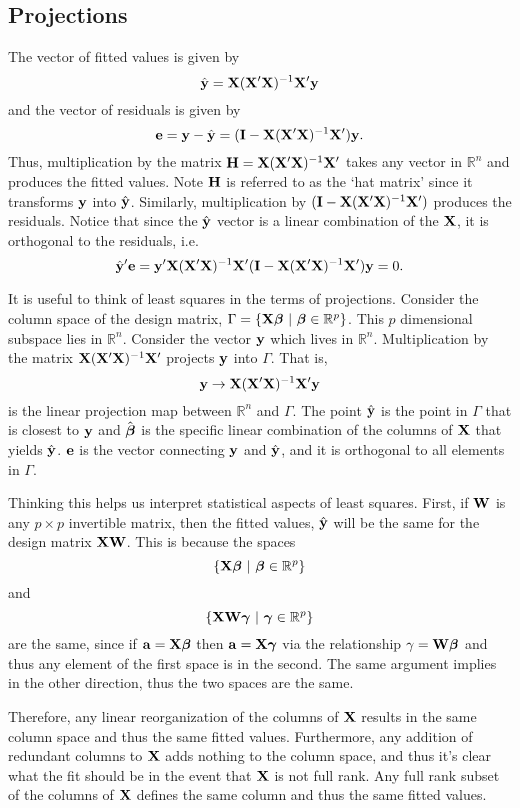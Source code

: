 \subsection{Projections}

The vector of fitted values is given by
$$
\hat {\mathbf{y}} = {\bf X} ({\bf X}'{\bf X})^{-1} {\bf X}' \mathbf{y}
$$
and the vector of residuals is given by
$$
\mathbf{e} = \mathbf{y} - \hat {\mathbf{y}} = (\mathbf{I} - {\bf X} ({\bf X}'{\bf X})^{-1} {\bf X}') \mathbf{y}.
$$
Thus, multiplication by the matrix $\mathbf{H}={\bf X} ({\bf X}'{\bf X})^{-1} {\bf X}'$ takes any vector in
$\mathbb{R}^n$ and produces the fitted values. Note $\mathbf{H}$ is referred to as the `hat matrix' since it transforms $\mathbf{y}$ into $\hat {\mathbf{y}}$.
Similarly, multiplication by $(\mathbf{I} - {\bf X} ({\bf X}'{\bf X})^{-1} {\bf X}')$ produces the residuals. 
Notice that since the $\hat {\mathbf{y}}$ vector is a linear combination of the $\mathbf{X}$,
it is orthogonal to the residuals, i.e.
$$
\hat {\mathbf{y}}' \mathbf{e} = \mathbf{y}' {\bf X} ({\bf X}'{\bf X})^{-1} {\bf X}' (\mathbf{I} - {\bf X} ({\bf X}'{\bf X})^{-1} {\bf X}')\mathbf{y} = 0.
$$

It is useful to think of least squares in the terms of projections.
Consider the column space of the design matrix, 
$\Gamma = \{ \mathbf{X} \boldsymbol{\beta} ~|~ \boldsymbol{\beta} \in \mathbb{R}^p\}$. This $p$ 
dimensional subspace lies in $\mathbb{R}^n$.
Consider the vector $\mathbf{y}$ which lives in $\mathbb{R}^n$. 
Multiplication by the matrix ${\bf X} ({\bf X}'{\bf X})^{-1} {\bf X}'$ projects $\mathbf{y}$ into $\Gamma$. That
is, 
$$
\mathbf{y} \rightarrow {\bf X} ({\bf X}'{\bf X})^{-1} {\bf X}' \mathbf{y}
$$
is the linear projection map between $\mathbb{R}^n$ and $\Gamma$.
The point $\hat {\mathbf{y}}$ is the point in $\Gamma$ that is closest to $\mathbf{y}$ and
$\hat {\boldsymbol{\beta}}$ is the specific linear combination of the columns
of $\mathbf{X}$ that yields $\hat {\mathbf{y}}$. 
$\mathbf{e}$ is the vector connecting $\mathbf{y}$ and $\hat {\mathbf{y}}$, and it is
orthogonal to all elements in $\Gamma$.  

Thinking this helps us interpret statistical aspects of least squares.
First, if $\mathbf{W}$ is any $p\times p $ invertible matrix, then the
fitted values, $\hat {\mathbf{y}}$ will be the same for the design matrix
$\mathbf{X} \mathbf{W}$. This is because the spaces
$$
\{\mathbf{X} \boldsymbol{\beta} ~|~ \boldsymbol{\beta} \in \mathbb{R}^p\}
$$
and
$$
\{\mathbf{X} \mathbf{W} \boldsymbol{\gamma} ~|~ \boldsymbol{\gamma} \in \mathbb{R}^p\}
$$
are the same, since if $\mathbf{a} = \mathbf{X} \boldsymbol{\beta}$ then $\mathbf{a} = \mathbf{X} \boldsymbol{\gamma}$ via the relationship $\gamma = \mathbf{W} \boldsymbol{\beta}$  and thus any element of the first
space is in the second. The same argument implies in the other direction,
thus the two spaces are the same.

Therefore, any linear reorganization of the columns of $\mathbf{X}$ results in the
same column space and thus the same fitted values. Furthermore, any
addition of redundant columns to $\mathbf{X}$ adds nothing to the column space,
and thus it's clear what the fit should be in the event that $\mathbf{X}$ is
not full rank. Any full rank subset of the columns of $\mathbf{X}$ defines
the same column and thus the same fitted values. 



